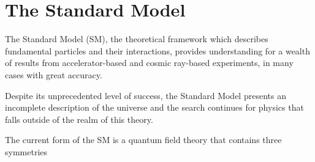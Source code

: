 \section{The Standard Model}

The Standard Model (SM), the theoretical framework which describes fundamental particles
and their interactions, provides understanding for a wealth of results from accelerator-based
and cosmic ray-based experiments, in many cases with great accuracy. 


Despite its unprecedented
level of success, the Standard Model presents an incomplete description of the universe and
the search continues for physics that falls outside of the realm of this theory.


The current form of the SM is a quantum field theory that contains three symmetries
